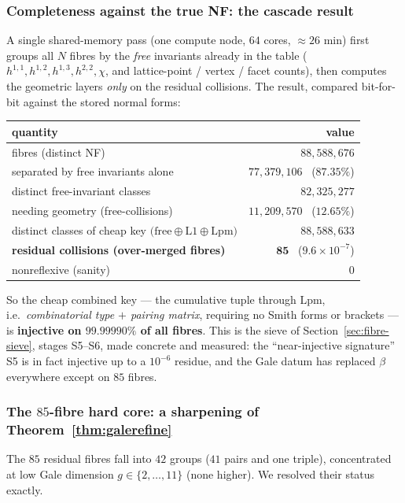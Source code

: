 \documentclass{amsart}
\begin{document}
\subsubsection*{Completeness against the true NF: the cascade result}

A single shared-memory pass (one compute node, $64$ cores, $\approx\!26$ min)
first groups all $N$ fibres by the \emph{free} invariants already in the table
($h^{1,1},h^{1,2},h^{1,3},h^{2,2},\chi$, and lattice-point / vertex / facet
counts), then computes the geometric layers \emph{only} on the residual
collisions. The result, compared bit-for-bit against the stored normal forms:
\begin{center}\small
\begin{tabular}{l r}
\hline
quantity & value \\
\hline
fibres (distinct NF) & $88{,}588{,}676$ \\
separated by free invariants alone & $77{,}379{,}106$ \ ($87.35\%$) \\
distinct free-invariant classes & $82{,}325{,}277$ \\
needing geometry (free-collisions) & $11{,}209{,}570$ \ ($12.65\%$) \\
distinct classes of cheap key $\mathrm{(free}\oplus\mathrm{L1}\oplus\mathrm{Lpm})$ & $88{,}588{,}633$ \\
\textbf{residual collisions (over-merged fibres)} & $\mathbf{85}$ \ ($9.6\times10^{-7}$) \\
nonreflexive (sanity) & $0$ \\
\hline
\end{tabular}
\end{center}
So the cheap combined key --- the cumulative tuple through $\mathrm{Lpm}$,
i.e.\ \emph{combinatorial type $+$ pairing matrix}, requiring no Smith forms or
brackets --- is \textbf{injective on $99.99990\%$ of all fibres}. This is the
sieve of Section~\ref{sec:fibre-sieve}, stages S5--S6, made concrete and measured:
the ``near-injective signature'' S5 is in fact injective up to a $10^{-6}$
residue, and the Gale datum has replaced $\beta$ everywhere except on $85$
fibres.

\subsubsection*{The $85$-fibre hard core: a sharpening of
Theorem~\ref{thm:galerefine}}

The $85$ residual fibres fall into $42$ groups ($41$ pairs and one triple),
concentrated at low Gale dimension $g\in\{2,\dots,11\}$ (none higher). We
resolved their status exactly.
\end{document}
